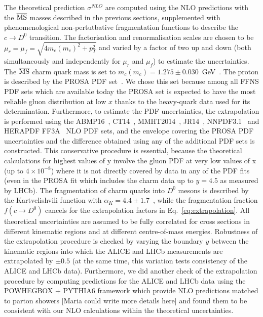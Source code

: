 \documentclass[12pt,a4paper]{article}
\newcommand{\msbar}{\ensuremath{\overline{\rm MS}}\xspace}
\newcommand{\dz}{\ensuremath{D^0}\xspace}
\begin{document}
The theoretical prediction $\sigma^{NLO}$ are computed using the NLO predictions with the \msbar masses described in the previous sections, supplemented with phenomenological non-pertutbative fragmentation functions to describe the $c \to \dz$ transition. The factorisation and renormalisation scales are chosen to be $\mu_r = \mu_f = \sqrt{4m_c(m_c)^2+p_T^2}$ and varied by a factor of two up and down (both simultaneously and independently for $\mu_r$ and $\mu_f$) to estimate the uncertainties. The \msbar charm quark mass is set to $m_c(m_c) = 1.275 \pm 0.030$~GeV~\cite{Tanabashi:2018oca}. The proton is described by the PROSA PDF set~\cite{Zenaiev:2015rfa}. We chose this set because among all FFNS PDF sets which are available today the PROSA set is expected to have the most reliable gluon distribution at low $x$ thanks to the heavy-quark data used for its determination. Furthermore, to estimate the PDF uncertainties, the extrapolation is performed using the ABMP16~\cite{Alekhin:2018pai}, CT14~\cite{Dulat:2015mca}, MMHT2014~\cite{Harland-Lang:2014zoa}, JR14~\cite{Jimenez-Delgado:2014twa}, NNPDF3.1~\cite{Ball:2017nwa} and HERAPDF FF3A~\cite{Abramowicz:2015mha} NLO PDF sets, and the envelope covering the PROSA PDF uncertainties and the difference obtained using any of the additional PDF sets is constructed. This conservative procedure is essential, because the theoretical calculations for highest values of y involve the gluon PDF at very low values of x (up to $4\times 10^{-8}$) where it is not directly covered by data in any of the PDF fits (even in the PROSA fit which includes the charm data up to $y = 4.5$ as measured by LHCb). The fragmentation of charm quarks into \dz mesons is described by the Kartvelishvili function with $\alpha_K = 4.4 \pm 1.7$~\cite{Zenaiev:2015rfa}, while the fragmentation fraction $f(c \to \dz)$ cancels for the extrapolation factors in Eq.~\ref{eq:extrapolation}. All theoretical uncertainties are assumed to be fully correlated for cross sections in different kinematic regions and at different centre-of-mass energies. Robustness of the extrapolation procedure is checked by varying the boundary $y$ between the kinematic regions into which the ALICE and LHCb measurements are extrapolated by $\pm 0.5$ (at the same time, this variation tests consistency of the ALICE and LHCb data). Furthermore, we did another check of the extrapolation procedure by computing predictions for the ALICE and LHCb data using the POWHEGBOX + PYTHIA6 framework which provide NLO predictions matched to parton showers [Maria could write more details here] and found them to be consistent with our NLO calculations within the theoretical uncertainties.
\end{document}
